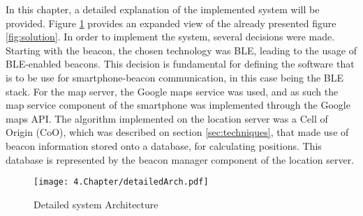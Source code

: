 
\label{cap:implement}


In this chapter, a detailed explanation of the implemented system will be provided. Figure \ref{fig:implementation} provides an expanded view of the already presented figure \ref{fig:solution}. In order to implement the system, several decisions were made. Starting with the beacon, the chosen technology was \ac{BLE}, leading to the usage of \ac{BLE}-enabled beacons. This decision is fundamental for defining the software that is to be use for smartphone-beacon communication, in this case being the \ac{BLE} stack. For the map server, the Google maps service was   
used, and as such the map service component of the smartphone was implemented through the Google maps API. The algorithm implemented on the location server was a Cell of Origin (CoO), which was described on section \ref{sec:techniques}, that made use of beacon information stored onto a database, for calculating positions. This database is represented by the beacon manager component of the location server. 

\begin{figure}[H]
	\centering
		\texttt{[image: 4.Chapter/detailedArch.pdf]}
	\caption[Detailed system Architecture]{Detailed system Architecture}
	\label{fig:implementation}
\end{figure}







\cleardoublepage

